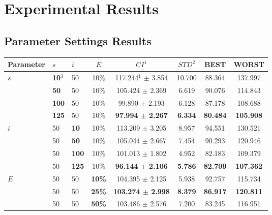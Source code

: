\chapter{Experimental Results}
\label{appendixC}

\section{Parameter Settings Results}

\begin{table}
    \centering
    \begin{tabular}{|l|l|l|c||c|c|c|c|}
    \hline
    Parameter & $s$ & $i$ & $E$ & $CI^1$ & $STD^2$ & BEST & WORST \\
    \hline
    $s$ & \textbf{10$^3$} & 50 & 10\% & 117.244$^1$ $\pm$ 3.854 & 10.700 & 88.364 & 137.997\\
    ~ & \textbf{50} & 50 & 10\% & 105.424 $\pm$ 2.369 & 6.619 & 90.076 & 114.843\\
    ~ & \textbf{100} & 50 & 10\% & 99.890 $\pm$ 2.193 & 6.128 & 87.178 & 108.688\\
    ~ & \textbf{125} & 50 & 10\% & \textbf{97.994 $\pm$ 2.267} & \textbf{6.334} & \textbf{80.484} & \textbf{105.908}\\
    \hline
    $i$ & 50 & \textbf{10} & 10\% & 113.209 $\pm$ 3.205 & 8.957 & 94.551 & 130.521\\
    ~ & 50 & \textbf{50} & 10\% & 105.044 $\pm$ 2.667 & 7.454 & 90.293 & 120.946\\
    ~ & 50 & \textbf{100} & 10\% & 101.013 $\pm$ 1.802 & 4.952 & 82.183 & 109.379\\
    ~ & 50 & \textbf{125} & 10\% & \textbf{96.144 $\pm$ 2.106} & \textbf{5.786} & \textbf{82.709} & \textbf{107.362}\\
    \hline
    $E$ & 50 & 50 & \textbf{10\%} & 104.395 $\pm$ 2.125 & 5.938 & 92.757 & 115.734\\
    ~ & 50 & 50 & \textbf{25\%} & \textbf{103.274 $\pm$ 2.998} & \textbf{8.379} & \textbf{86.917} & \textbf{120.811}\\
    ~ & 50 & 50 & \textbf{50\%} & 103.486 $\pm$ 2.576 & 7.200 & 83.245 & 116.951\\

\end{tabular}
\end{table}
